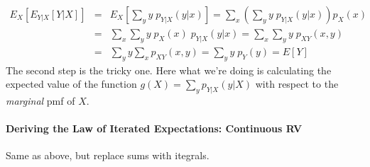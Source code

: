 \documentclass[12pt]{article}
\begin{document}
\begin{eqnarray*}
	E_X\left[ E_{Y|X}\left[Y|X\right] \right] &=&E_X\left[ \sum_y y \; p_{Y|X}(y|x)\right] = \sum_x \left( \sum_y y \; p_{Y|X}(y|x)\right) p_X(x) \\
		&=& \sum_x \sum_y y \; p_X(x) \; p_{Y|X}(y|x) = \sum_x \sum_y y \; p_{XY}(x,y)\\
		&=& \sum_y y \sum_x p_{XY}(x,y) = \sum_y y \;p_Y(y) = E[Y]
\end{eqnarray*}
The second step is the tricky one. Here what we're doing is calculating the expected value of the function $g(X) = \sum_y p_{Y|X}(y|X)$ with respect to the \emph{marginal} pmf of $X$. 

\paragraph{Deriving the Law of Iterated Expectations: Continuous RV}
Same as above, but replace sums with itegrals.
\end{document}
